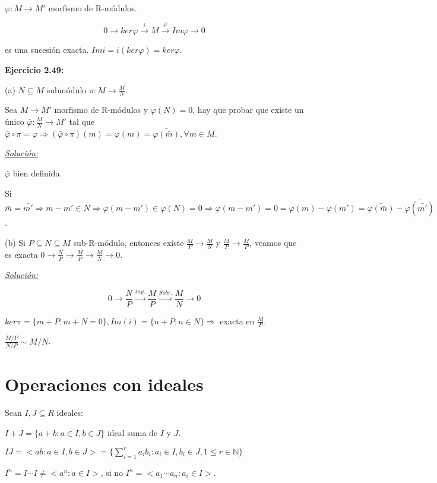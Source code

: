 $\varphi: M\rightarrow M'$ morfismo de R-módulos. 

$$0\rightarrow ker \varphi \xrightarrow{i} M \xrightarrow{\varphi} Im \varphi \rightarrow 0 $$

es una sucesión exacta. $Im i = i(ker \varphi)=ker\varphi$.

\textbf{Ejercicio 2.49:}  

(a) $N\subseteq M$ submódulo $\pi: M \rightarrow  \frac{M}{N}$. 

Sea $M\rightarrow M'$ morfismo de R-módulos y $\varphi(N)=0$, hay que probar que existe un único $\bar{\varphi}: \frac{M}{N}\rightarrow M'$ tal que $\bar{\varphi}\circ \pi =\varphi \Rightarrow (\bar{\varphi}\circ \pi)(m) = \varphi (m) = \bar{\varphi(\bar{m})}, \forall m \in M$. 

\underline{\textit{Solución: }}


$\bar{\varphi}$ bien definida. 

Si $\bar{m}=\bar{m'} \Rightarrow m-m'\in N \Rightarrow \varphi(m-m') \in \varphi(N)=0  \Rightarrow \varphi(m-m')=0= \varphi(m)-\varphi(m')=\bar{\varphi(\bar{m})}-\bar{\varphi(\bar{m'})}$. 

(b) Si $P\subseteq N \subseteq M$ sub-R-módulo, entonces existe $\frac{M}{P} \rightarrow \frac{M}{N}$ y $\frac{M}{P} \rightarrow \frac{M}{P}$, veamos que es exacta $0\rightarrow \frac{N}{P} \rightarrow \frac{M}{P} \rightarrow  \frac{M}{N} \rightarrow 0$.

\underline{\textit{Solución: }}

$$0\rightarrow \frac{N}{P} \xrightarrow{iny.} \frac{M}{P} \xrightarrow{Sobr.}  \frac{M}{N} \rightarrow 0$$

$ker \pi = \{ m+P:m+N=0 \}, Im (i) = \{n+P: n\in N \} \Rightarrow $ exacta en $\frac{M}{P}$. 

$\frac{M/P}{N/P} \sim M/N$.

\section{Operaciones con ideales}

Sean $I,J\subseteq R$ ideales:
\begin{itemize*}
\item $I+J = \{a+b : a\in I, b\in J \}$ ideal suma de $I$ y $J$.
\item $IJ = <ab : a \in I, b \in J > = \{ \sum_{i=1}^ra_ib_i : a_i \in I, b_i \in J, 1 \le r \in \mathbb{N} \}$ 
\item $I^n=I\cdots I \neq <a^n : a\in I>$, si no $I^n = <a_1\cdots a_n : a_i \in I >$. 
\end{itemize*}

